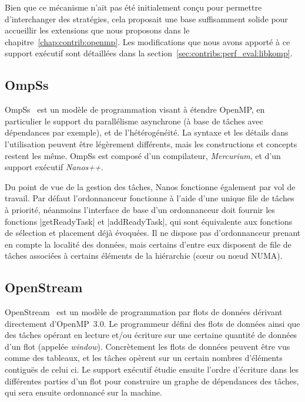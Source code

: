 Bien que ce mécanisme n'ait pas été initialement conçu pour permettre d'interchanger des stratégies, cela proposait une base suffisamment solide pour accueillir les extensions que nous proposons dans le chapitre~\ref{chap:contrib:openmp}.
Les modifications que nous avons apporté à ce support exécutif sont détaillées dans la section~\ref{sec:contribs:perf_eval:libkomp}.


\subsection{OmpSs}\label{subsec:rw:ompss}

OmpSs~\cite{OMPSs} est un modèle de programmation visant à étendre OpenMP, en particulier le support du parallélisme asynchrone (à base de tâches avec dépendances par exemple), et de l'hétérogénéité.
La syntaxe et les détails dans l'utilisation peuvent être légèrement différents, mais les constructions et concepts restent les même.
OmpSs est composé d'un compilateur, \emph{Mercurium}, et d'un support exécutif \emph{Nanos++}.

Du point de vue de la gestion des tâches, Nanos fonctionne également par vol de travail.
Par défaut l'ordonnanceur fonctionne à l'aide d'une unique file de tâches à priorité, néanmoins l'interface de base d'un ordonnanceur doit fournir les fonctions |getReadyTask| et |addReadyTask|, qui sont équivalente aux fonctions de sélection et placement déjà évoquées.
Il ne dispose pas d'ordonnanceur prenant en compte la localité des données, mais certains d'entre eux disposent de file de tâches associées à certains éléments de la hiérarchie (cœur ou nœud NUMA).


\subsection{OpenStream}

OpenStream~\cite{Pop2013} est un modèle de programmation par flots de données dérivant directement d'OpenMP~3.0.
Le programmeur défini des flots de données ainsi que des tâches opérant en lecture et/ou écriture sur une certaine quantité de données d'un flot (appelée \emph{window}).
Concrètement les flots de données peuvent être vus comme des tableaux, et les tâches opèrent sur un certain nombres d'éléments contiguës de celui ci.
Le support exécutif étudie ensuite l'ordre d'écriture dans les différentes parties d'un flot pour construire un graphe de dépendances des tâches, qui sera ensuite ordonnancé sur la machine.

